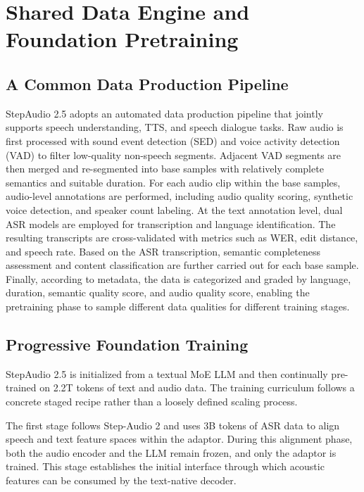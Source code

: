 \section{Shared Data Engine and Foundation Pretraining}
\label{sec:data}

\subsection{A Common Data Production Pipeline}

StepAudio 2.5 adopts an automated data production pipeline that jointly supports speech understanding, TTS, and speech dialogue tasks. Raw audio is first processed with sound event detection (SED) and voice activity detection (VAD) to filter low-quality non-speech segments. Adjacent VAD segments are then merged and re-segmented into base samples with relatively complete semantics and suitable duration. For each audio clip within the base samples, audio-level annotations are performed, including audio quality scoring, synthetic voice detection, and speaker count labeling. At the text annotation level, dual ASR models are employed for transcription and language identification. The resulting transcripts are cross-validated with metrics such as WER, edit distance, and speech rate. Based on the ASR transcription, semantic completeness assessment and content classification are further carried out for each base sample. Finally, according to metadata, the data is categorized and graded by language, duration, semantic quality score, and audio quality score, enabling the pretraining phase to sample different data qualities for different training stages.

\subsection{Progressive Foundation Training}

StepAudio 2.5 is initialized from a textual MoE LLM and then continually pre-trained on 2.2T tokens of text and audio data. The training curriculum follows a concrete staged recipe rather than a loosely defined scaling process.

The first stage follows Step-Audio 2 and uses 3B tokens of ASR data to align speech and text feature spaces within the adaptor. During this alignment phase, both the audio encoder and the LLM remain frozen, and only the adaptor is trained. This stage establishes the initial interface through which acoustic features can be consumed by the text-native decoder.

